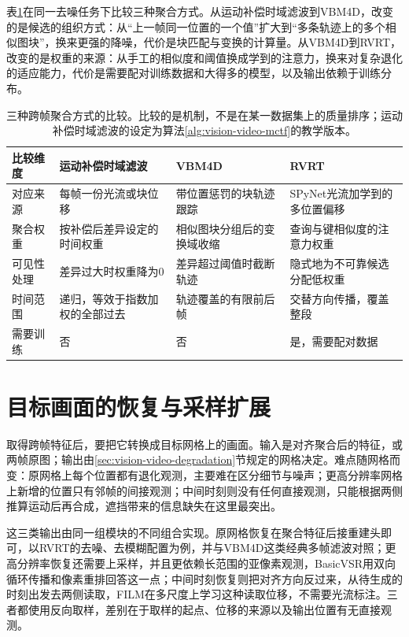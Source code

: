 表\ref{tab:vision-video-aggregation-methods}在同一去噪任务下比较三种聚合方式。从运动补偿时域滤波到VBM4D，改变的是候选的组织方式：从“上一帧同一位置的一个值”扩大到“多条轨迹上的多个相似图块”，换来更强的降噪，代价是块匹配与变换的计算量。从VBM4D到RVRT，改变的是权重的来源：从手工的相似度和阈值换成学到的注意力，换来对复杂退化的适应能力，代价是需要配对训练数据和大得多的模型，以及输出依赖于训练分布。

\begin{table}[htbp]
  \centering
  \small
  \begin{tabularx}{\linewidth}{@{}lXXX@{}}
    \toprule
    比较维度 & 运动补偿时域滤波 & VBM4D & RVRT\\
    \midrule
    对应来源 & 每帧一份光流或块位移 & 带位置惩罚的块轨迹跟踪 & SPyNet光流加学到的多位置偏移\\
    聚合权重 & 按补偿后差异设定的时间权重 & 相似图块分组后的变换域收缩 & 查询与键相似度的注意力权重\\
    可见性处理 & 差异过大时权重降为0 & 差异超过阈值时截断轨迹 & 隐式地为不可靠候选分配低权重\\
    时间范围 & 递归，等效于指数加权的全部过去 & 轨迹覆盖的有限前后帧 & 交替方向传播，覆盖整段\\
    需要训练 & 否 & 否 & 是，需要配对数据\\
    \bottomrule
  \end{tabularx}
  \caption{三种跨帧聚合方式的比较。比较的是机制，不是在某一数据集上的质量排序；运动补偿时域滤波的设定为算法\ref{alg:vision-video-mctf}的教学版本。}
  \label{tab:vision-video-aggregation-methods}
\end{table}

\section{目标画面的恢复与采样扩展}
\label{sec:vision-video-restoration-output}

取得跨帧特征后，要把它转换成目标网格上的画面。输入是对齐聚合后的特征，或两帧原图；输出由\ref{sec:vision-video-degradation}节规定的网格决定。难点随网格而变：原网格上每个位置都有退化观测，主要难在区分细节与噪声；更高分辨率网格上新增的位置只有邻帧的间接观测；中间时刻则没有任何直接观测，只能根据两侧推算运动后再合成，遮挡带来的信息缺失在这里最突出。

这三类输出由同一组模块的不同组合实现。原网格恢复在聚合特征后接重建头即可，以RVRT的去噪、去模糊配置为例，并与VBM4D这类经典多帧滤波对照；更高分辨率恢复还需要上采样，并且更依赖长范围的亚像素观测，BasicVSR用双向循环传播和像素重排回答这一点；中间时刻恢复则把对齐方向反过来，从待生成的时刻出发去两侧读取，FILM在多尺度上学习这种读取位移，不需要光流标注。三者都使用反向取样，差别在于取样的起点、位移的来源以及输出位置有无直接观测。

